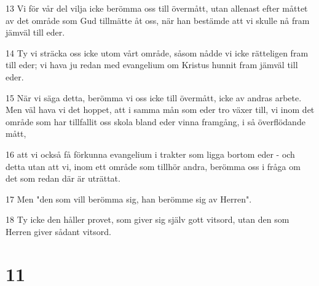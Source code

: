 \par 13 Vi för vår del vilja icke berömma oss till övermått, utan allenast efter måttet av det område som Gud tillmätte åt oss, när han bestämde att vi skulle nå fram jämväl till eder.
\par 14 Ty vi sträcka oss icke utom vårt område, såsom nådde vi icke rätteligen fram till eder; vi hava ju redan med evangelium om Kristus hunnit fram jämväl till eder.
\par 15 När vi säga detta, berömma vi oss icke till övermått, icke av andras arbete. Men väl hava vi det hoppet, att i samma mån som eder tro växer till, vi inom det område som har tillfallit oss skola bland eder vinna framgång, i så överflödande mått,
\par 16 att vi också få förkunna evangelium i trakter som ligga bortom eder - och detta utan att vi, inom ett område som tillhör andra, berömma oss i fråga om det som redan där är uträttat.
\par 17 Men "den som vill berömma sig, han berömme sig av Herren".
\par 18 Ty icke den håller provet, som giver sig själv gott vitsord, utan den som Herren giver sådant vitsord.

\chapter{11}

